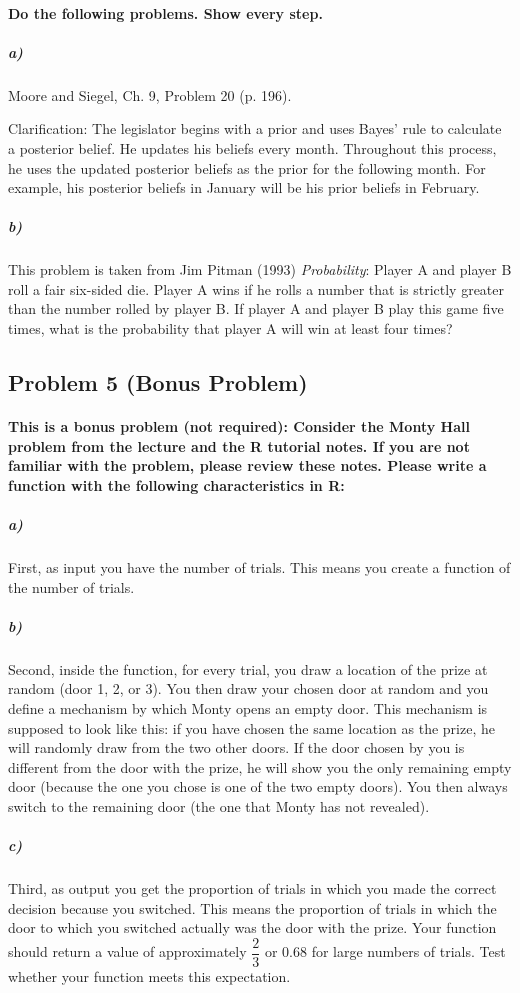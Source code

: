 \documentclass[12pt,letter]{article}
\begin{document}
\paragraph{Do the following problems. Show every step.}

\subparagraph{a)} Moore and Siegel, Ch. 9, Problem 20 (p. 196).

Clarification: The legislator begins with a prior and uses Bayes' rule to calculate a posterior belief. He updates his beliefs every month. Throughout this process, he uses the updated posterior beliefs as the prior for the following month. For example, his posterior beliefs in January will be his prior beliefs in February.

\subparagraph{b)} This problem is taken from Jim Pitman (1993) \textit{Probability}: Player A and player B roll a fair six-sided die. Player A wins if he rolls a number that is strictly greater than the number rolled by player B. If player A and player B play this game five times, what is the probability that player A will win at least four times? %



\subsection*{Problem 5 (Bonus Problem)}

\paragraph{This is a bonus problem (not required): Consider the Monty Hall problem from the lecture and the R tutorial notes. If you are not familiar with the problem, please review these notes. Please write a function with the following characteristics in R:}

\subparagraph{a)} First, as input you have the number of trials. This means you create a function of the number of trials.

\subparagraph{b)} Second, inside the function, for every trial, you draw a location of the prize at random (door 1, 2, or 3). You then draw your chosen door at random and you define a mechanism by which Monty opens an empty door. This mechanism is supposed to look like this:  if you have chosen the same location as the prize, he will randomly draw from the two other doors. If the door chosen by you is different from the door with the prize, he will show you the only remaining empty door (because the one you chose is one of the two empty doors). You then always switch to the remaining door (the one that Monty has not revealed).

\subparagraph{c)} Third, as output you get the proportion of trials in which you made the correct decision because you switched. This means the proportion of trials in which the door to which you switched actually was the door with the prize. Your function should return a value of  approximately $\dfrac{2}{3}$ or 0.68 for large numbers of trials. Test whether your function meets this expectation.
\end{document}

